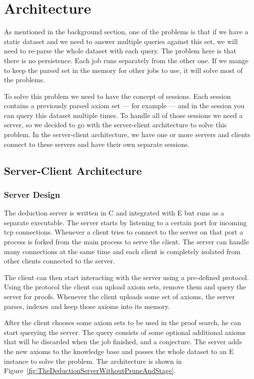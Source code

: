 \chapter{Architecture}

As mentioned in the background section, one of the problems is that if we have a static dataset and we need to answer multiple queries against this set, we will need to re-parse the whole dataset with each query. The problem here is that there is no persistence. Each job runs separately from the other one. If we mange to keep the parsed set in the memory for other jobs to use, it will solve most of the problems.

To solve this problem we need to have the concept of sessions. Each session contains a previously parsed axiom set --- for example --- and in the session you can query this dataset multiple times. To handle all of those sessions we need a server, so we decided to go with the server-client architecture to solve this problem. In the server-client architecture, we have one or more servers and clients connect to these servers and have their own separate sessions.

\section{Server-Client Architecture}
\subsection{Server Design}
The deduction server is written in C and integrated with E but runs as a separate executable. The server starts by listening to a certain port for incoming \ac{tcp} connections. Whenever a client tries to connect to the server on that port a process is forked from the main process to serve the client. The server can handle many connections at the same time and each client is completely isolated from other clients connected to the server.

The client can then start interacting with the server using a pre-defined protocol. Using the protocol the client can upload axiom sets, remove them and query the server for proofs. Whenever the client uploads some set of axioms, the server parses, indexes and keep those axioms into its memory. 

After the client chooses some axiom sets to be used in the proof search, he can start querying the server. The query consists of some optional additional axioms that will be discarded when the job finished, and a conjecture. The server adds the new axioms to the knowledge base and passes the whole dataset to an E instance to solve the problem. The architecture is shown in Figure~\ref{fig:TheDeductionServerWithoutPruneAndStage}.

